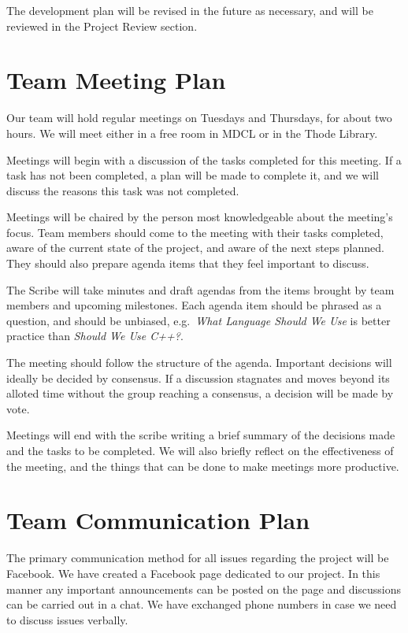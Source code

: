 \documentclass{article}
\begin{document}
The development plan will be revised in the future as necessary, and will be reviewed in the Project Review section. 

\section{Team Meeting Plan} %
Our team will hold regular meetings on Tuesdays and Thursdays, for about two hours. We will meet either in a free room in MDCL or in the Thode Library.

Meetings will begin with a discussion of the tasks completed for this meeting. If a task has not been completed, a plan will be made to complete it, and we will discuss the reasons this task was not completed.

  Meetings will be chaired by the person most knowledgeable about the meeting's focus. Team members should come to the meeting with their tasks completed, aware of the current state of the project, and aware of the next steps planned. They should also prepare agenda items that they feel important to discuss. 

  The Scribe will take minutes and draft agendas from the items brought by team members and upcoming milestones. Each agenda item should be phrased as a question, and should be unbiased, e.g.\ \textit{What Language Should We Use} is better practice than \textit{Should We Use C++?}.

  The meeting should follow the structure of the agenda. Important decisions will ideally be decided by consensus. If a discussion stagnates and moves beyond its alloted time without the group reaching a consensus, a decision will be made by vote.
  
  Meetings will end with the scribe writing a brief summary of the decisions made and the tasks to be completed. We will also briefly reflect on the effectiveness of the meeting, and the things that can be done to make meetings more productive.
\section{Team Communication Plan} %

The primary communication method for all issues regarding the project will be Facebook. We have created a Facebook page dedicated to our project. In this manner any important announcements can be posted on the page and discussions can be carried out in a chat. We have exchanged phone numbers in case we need to discuss issues verbally. 
\end{document}
